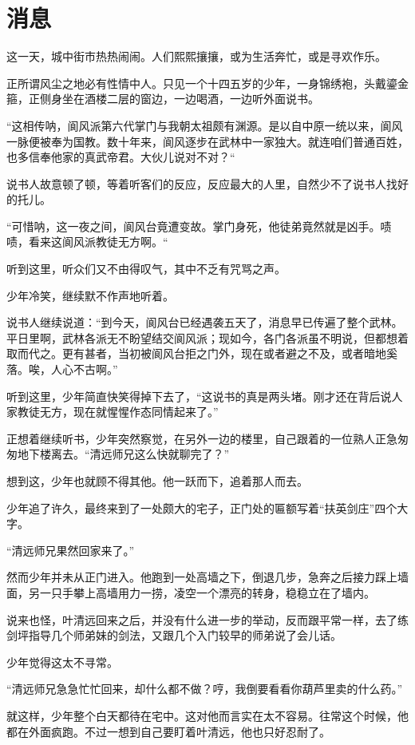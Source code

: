 \chapter{消息}
这一天，城中街市热热闹闹。人们熙熙攘攘，或为生活奔忙，或是寻欢作乐。

正所谓风尘之地必有性情中人。只见一个十四五岁的少年，一身锦绣袍，头戴鎏金箍，正侧身坐在酒楼二层的窗边，一边喝酒，一边听外面说书。

“这相传呐，阆风派第六代掌门与我朝太祖颇有渊源。是以自中原一统以来，阆风一脉便被奉为国教。数十年来，阆风逐步在武林中一家独大。就连咱们普通百姓，也多信奉他家的真武帝君。大伙儿说对不对？“

说书人故意顿了顿，等着听客们的反应，反应最大的人里，自然少不了说书人找好的托儿。

“可惜呐，这一夜之间，阆风台竟遭变故。掌门身死，他徒弟竟然就是凶手。啧啧，看来这阆风派教徒无方啊。“

听到这里，听众们又不由得叹气，其中不乏有咒骂之声。

少年冷笑，继续默不作声地听着。

说书人继续说道：“到今天，阆风台已经遇袭五天了，消息早已传遍了整个武林。平日里啊，武林各派无不盼望结交阆风派；现如今，各门各派虽不明说，但都想着取而代之。更有甚者，当初被阆风台拒之门外，现在或者避之不及，或者暗地奚落。唉，人心不古啊。”

听到这里，少年简直快笑得掉下去了，“这说书的真是两头堵。刚才还在背后说人家教徒无方，现在就惺惺作态同情起来了。”

正想着继续听书，少年突然察觉，在另外一边的楼里，自己跟着的一位熟人正急匆匆地下楼离去。“清远师兄这么快就聊完了？”

想到这，少年也就顾不得其他。他一跃而下，追着那人而去。

少年追了许久，最终来到了一处颇大的宅子，正门处的匾额写着“扶英剑庄”四个大字。

“清远师兄果然回家来了。”

然而少年并未从正门进入。他跑到一处高墙之下，倒退几步，急奔之后接力踩上墙面，另一只手攀上高墙用力一捞，凌空一个漂亮的转身，稳稳立在了墙内。

说来也怪，叶清远回来之后，并没有什么进一步的举动，反而跟平常一样，去了练剑坪指导几个师弟妹的剑法，又跟几个入门较早的师弟说了会儿话。

少年觉得这太不寻常。

“清远师兄急急忙忙回来，却什么都不做？哼，我倒要看看你葫芦里卖的什么药。”

就这样，少年整个白天都待在宅中。这对他而言实在太不容易。往常这个时候，他都在外面疯跑。不过一想到自己要盯着叶清远，他也只好忍耐了。

